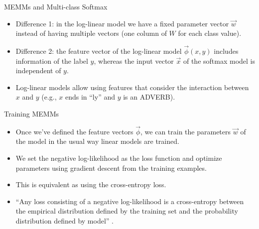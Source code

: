 \documentclass[handout]{beamer}
\begin{document}
\begin{frame}{MEMMs and Multi-class Softmax}
\begin{scriptsize}
\begin{itemize}

\item Difference 1: in the log-linear model we have a fixed parameter vector $\vec{w}$ instead of having multiple vectors (one column of $W$ for each class value).

\item Difference 2: the feature vector of the log-linear model $\vec{\phi}(x,y)$ includes information of the label $y$, whereas the input vector $\vec{x}$ of the softmax model is independent of $y$. 

\item Log-linear models allow using features that consider the interaction between $x$ and $y$ (e.g., $x$ ends in ``ly'' and $y$ is an ADVERB).

 
\end{itemize}


\end{scriptsize}
\end{frame}



\begin{frame}{Training MEMMs}
\begin{scriptsize}
\begin{itemize}

\item Once we've defined the feature vectors $\vec{\phi}$, we can train the parameters $\vec{w}$ of the model in the usual way linear models are trained.

\item We set the negative log-likelihood as the loss function and optimize parameters using gradient descent from the training examples.

\item This is equivalent as using the cross-entropy loss.

\item ``Any loss consisting of a negative log-likelihood is a cross-entropy between the empirical distribution defined by the training set and the probability distribution defined by model'' \cite{goodfellow2016deep}.  
 
\end{itemize}


\end{scriptsize}
\end{frame}
\end{document}

